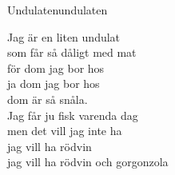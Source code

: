 \begin{song}{Undulaten}{undulaten}

\begin{vers}
Jag är en liten undulat\\
som får så dåligt med mat\\
för dom jag bor hos\\
ja dom jag bor hos\\
dom är så snåla.\\
Jag får ju fisk varenda dag\\
men det vill jag inte ha\\
jag vill ha rödvin\\
jag vill ha rödvin och gorgonzola\\
\end{vers}
\end{song}
